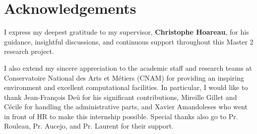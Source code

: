 \chapter*{Acknowledgements}

I express my deepest gratitude to my supervisor, \textbf{Christophe Hoareau}, for his guidance, insightful discussions, and continuous support throughout this Master 2 research project.

I also extend my sincere appreciation to the academic staff and research teams at Conservatoire National des Arts et Métiers (CNAM) for providing an inspiring environment and excellent computational facilities. In particular, I would like to thank Jean-François Deü for his significant contributions, Mireille Gillet and Cécile for handling the administrative parts, and Xavier Amandoleses who went in front of HR to make this internship possible. Special thanks also go to Pr. Rouleau, Pr. Aucejo, and Pr. Laurent for their support.

